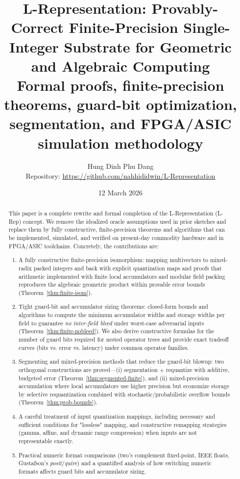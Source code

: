 \documentclass[11pt]{article}
\title{L-Representation: Provably-Correct Finite-Precision Single-Integer Substrate for Geometric and Algebraic Computing\\
\large Formal proofs, finite-precision theorems, guard-bit optimization, segmentation, and FPGA/ASIC simulation methodology}
\author{Hung Dinh Phu Dang\\
\small Repository: \url{https://github.com/nahhididwin/L-Representation}}
\date{12 March 2026}
\theoremstyle{definition}
\theoremstyle{plain}
\begin{document}
\maketitle

\begin{abstract}
This paper is a complete rewrite and formal completion of the L-Representation (L-Rep) concept. We remove the idealized oracle assumptions used in prior sketches and replace them by fully constructive, finite-precision theorems and algorithms that can be implemented, simulated, and verified on present-day commodity hardware and in FPGA/ASIC toolchains.  Concretely, the contributions are:
\begin{enumerate}
  \item A fully constructive finite-precision isomorphism: mapping multivectors to mixed-radix packed integers and back with explicit quantization maps and proofs that arithmetic implemented with finite local accumulators and modular field packing reproduces the algebraic geometric product within provable error bounds (Theorem~\ref{thm:finite-isom}).
  \item Tight guard-bit and accumulator sizing theorems: closed-form bounds and algorithms to compute the minimum accumulator widths and storage widths per field to guarantee \emph{no inter-field bleed} under worst-case adversarial inputs (Theorem~\ref{thm:finite-nobleed}).  We also derive constructive formulas for the number of guard bits required for nested operator trees and provide exact tradeoff curves (bits vs. error vs. latency) under common operator families.
  \item Segmenting and mixed-precision methods that reduce the guard-bit blowup: two orthogonal constructions are proved---(i) segmentation + requantize with additive, budgeted error (Theorem~\ref{thm:segmented-finite}), and (ii) mixed-precision accumulation where local accumulators use higher precision but economize storage by selective requantization combined with stochastic/probabilistic overflow bounds (Theorem~\ref{thm:prob-bounds}).
  \item A careful treatment of input quantization mappings, including necessary and sufficient conditions for "lossless" mapping, and constructive remapping strategies (gamma, affine, and dynamic range compression) when inputs are not representable exactly.
  \item Practical numeric format comparisons (two's complement fixed-point, IEEE floats, Gustafson's \emph{posit}/\emph{quire}) and a quantified analysis of how switching numeric formats affects guard bits and accumulator sizing.

\end{enumerate}
\end{abstract}
\end{document}
